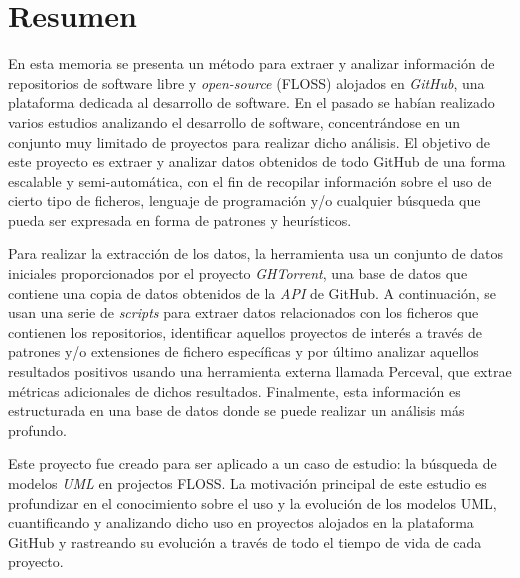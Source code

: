 \documentclass[a4paper, 12pt]{book}
\begin{document}
\chapter*{Resumen}
En esta memoria se presenta un método para extraer y analizar información de repositorios de software libre y \textit{open-source}
(FLOSS) alojados en \emph{GitHub}, una plataforma dedicada al desarrollo de software. En el pasado se habían realizado varios estudios
analizando el desarrollo de software, concentrándose en un conjunto muy limitado de proyectos para realizar
dicho análisis. El objetivo de este proyecto es extraer y analizar datos obtenidos de todo GitHub de una forma escalable
y semi-automática, con el fin de recopilar información sobre el uso de cierto tipo de ficheros, lenguaje de programación
y/o cualquier búsqueda que pueda ser expresada en forma de patrones y heurísticos.\par
Para realizar la extracción de los datos, la herramienta usa un conjunto de datos iniciales proporcionados por el proyecto
\emph{GHTorrent}, una base de datos que contiene una copia de datos obtenidos de la \emph{API} de GitHub.
A continuación, se usan una serie de \textit{scripts} para extraer datos relacionados con los ficheros que contienen los
repositorios, identificar aquellos proyectos de interés a través de patrones y/o extensiones de fichero específicas y
por último analizar aquellos resultados positivos usando una herramienta externa llamada Perceval, que extrae métricas
adicionales de dichos resultados. Finalmente, esta información es estructurada en una base de datos donde se puede
realizar un análisis más profundo.\par
Este proyecto fue creado para ser aplicado a un caso de estudio: la búsqueda de modelos \emph{UML} en projectos FLOSS.
La motivación principal de este estudio es profundizar en el conocimiento sobre el uso y la evolución de los modelos UML,
cuantificando y analizando dicho uso en proyectos alojados en la plataforma GitHub y rastreando su evolución a través de
todo el tiempo de vida de cada proyecto.

\end{document}

